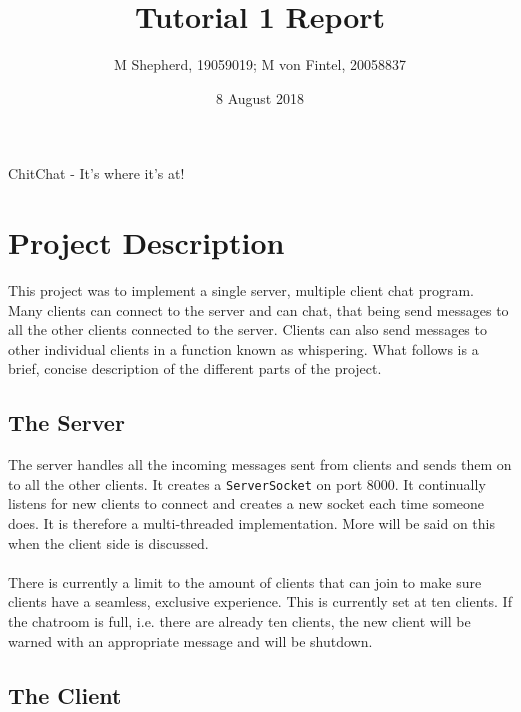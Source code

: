 \documentclass[12pt]{article}
\begin{document}
\title{Tutorial 1 Report}
\author{M Shepherd, 19059019; M von Fintel, 20058837}
\date{8 August 2018}

\maketitle

\centerline{ChitChat - It's where it's at!}

\newpage

\section{Project Description}

This project was to implement a single server, multiple client chat program.
Many clients can connect to the server and can chat, that being send messages to
all the other clients connected to the server. Clients can also send messages to
other individual clients in a function known as whispering. What follows is a brief,
concise description of the different parts of the project.

\subsection{The Server}

The server handles all the incoming messages sent from clients and sends them on
to all the other clients. It creates a \texttt{ServerSocket} on port 8000. It continually
listens for new clients to connect and creates a new socket each time someone
does. It is therefore a multi-threaded implementation. More will be said on this
when the client side is discussed.
\\\\
There is currently a limit to the amount of clients that
can join to make sure clients have a seamless, exclusive experience. This is currently set
at ten clients. If the chatroom is full, i.e. there are already ten clients, the new client
will be warned with an appropriate message and will be shutdown.

\subsection{The Client}
\end{document}
